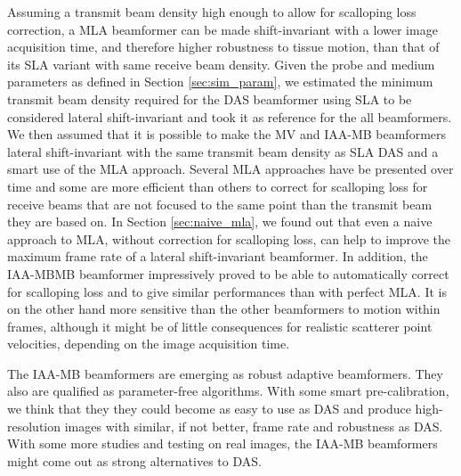 Assuming a transmit beam density high enough to allow for scalloping loss correction, a MLA beamformer can be made shift-invariant with a lower image acquisition time, and therefore higher robustness to tissue motion, than that of its SLA variant with same receive beam density.
Given the probe and medium parameters as defined in Section \ref{sec:sim_param}, we estimated the minimum transmit beam density required for the DAS beamformer using SLA to be considered lateral shift-invariant and took it as reference for the all beamformers.
We then assumed that it is possible to make the MV and IAA-MB beamformers lateral shift-invariant with the same transmit beam density as SLA DAS and a smart use of the MLA approach.
Several MLA approaches have be presented over time and some are more efficient than others to correct for scalloping loss for receive beams that are not focused to the same point than the transmit beam they are based on.
In Section \ref{sec:naive_mla}, we found out that even a naive approach to MLA, without correction for scalloping loss, can help to improve the maximum frame rate of a lateral shift-invariant beamformer.
In addition, the IAA-MBMB beamformer impressively proved to be able to automatically correct for scalloping loss and to give similar performances than with perfect MLA.
It is on the other hand more sensitive than the other beamformers to motion within frames, although it might be of little consequences for realistic scatterer point velocities, depending on the image acquisition time.

The IAA-MB beamformers are emerging as robust adaptive beamformers.
They also are qualified as parameter-free algorithms. With some smart pre-calibration, we think that they they could become as easy to use as DAS and produce high-resolution images with similar, if not better, frame rate and robustness as DAS.
With some more studies and testing on real images, the IAA-MB beamformers might come out as strong alternatives to DAS.

